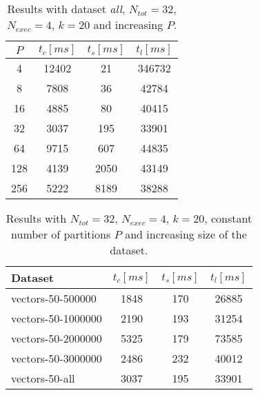 \documentclass[a4paper, 11pt]{article}
\begin{document}
\bgroup
\def\arraystretch{1.3}%
\begin{footnotesize}
	\begin{table}[!htb]
		\centering
		\vspace{10pt}
		\caption{Results with dataset \textit{all}, $N_{tot} = 32$, $N_{exec} = 4$, $k=20$  and increasing $P$.}\label{table:b}
		\begin{tabular}{c|c|c|c} 
			\hline
			\textbf{$P$} & \textbf{$t_c [ms]$} & \textbf{$t_s [ms]$} & \textbf{$t_l [ms]$} \\
			\hline
			4 &  12402 &  21 & 346732\\ 
			8 & 7808 &  36  & 42784\\
			16 &  4885 &  80 & 40415\\
			32 & 3037 &  195 & 33901\\
			64 &  9715&  607& 44835\\
			128 &  4139 & 2050 & 43149\\
			256 & 5222 &  8189 & 38288 \\

			\hline
		\end{tabular}
	\end{table}
\end{footnotesize}
\egroup

\bgroup
\def\arraystretch{1.3}%
\begin{footnotesize}
	\begin{table}[!htb]
		\centering
		\vspace{10pt}
		\caption{Results with $N_{tot} = 32$, $N_{exec} = 4$, $k=20$, constant number of partitions $P$  and increasing size of the dataset.}\label{table:c}
		\begin{tabular}{l|c|c|c} 
			\hline
			\textbf{Dataset} & \textbf{$t_c [ms]$} & \textbf{$t_s [ms]$} & \textbf{$t_l [ms]$} \\
			\hline
			vectors-50-500000 &  1848 &  170 & 26885\\
			vectors-50-1000000 &  2190  &  193  & 31254 \\ 
			vectors-50-2000000 &  5325&    179& 73585\\
			vectors-50-3000000&  2486 &  232 &40012 \\
			vectors-50-all &  3037 &  195 & 33901\\

			\hline
		\end{tabular}
	\end{table}
\end{footnotesize}
\egroup
\end{document}
